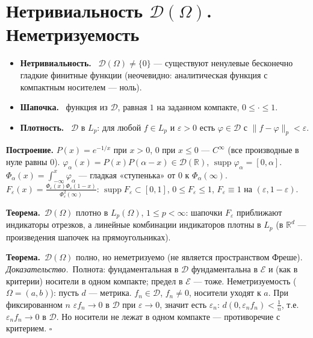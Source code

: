 \documentclass[11pt,a4paper]{article}
\newcommand{\RR}{\mathbb R}
\newcommand{\DD}{\mathcal D}
\newcommand{\EE}{\mathcal E}
\newcommand{\supp}{\operatorname{supp}}
\newcommand{\df}[1]{\textbf{#1.}~}
\newcommand{\thm}{\textbf{Теорема.}~}
\newcommand{\pf}{\textit{Доказательство.}~}
\newcommand{\qedd}{\hfill$\square$}
\begin{document}
\section{Нетривиальность $\DD(\Omega)$. Неметризуемость}
\begin{defs}
\begin{itemize}
\item \df{Нетривиальность} $\DD(\Omega)\ne\{0\}$ — существуют ненулевые бесконечно гладкие финитные функции (неочевидно: аналитическая функция с компактным носителем — ноль).
\item \df{Шапочка} функция из $\DD$, равная $1$ на заданном компакте, $0\le\cdot\le1$.
\item \df{Плотность} $\DD$ в $L_p$: для любой $f\in L_p$ и $\varepsilon>0$ есть $\varphi\in\DD$ с $\|f-\varphi\|_p<\varepsilon$.
\end{itemize}
\end{defs}

\textbf{Построение.} $P(x)=e^{-1/x}$ при $x>0$, $0$ при $x\le0$ — $C^\infty$ (все производные в нуле равны $0$). $\varphi_\alpha(x)=P(x)P(\alpha-x)\in\DD(\RR)$, $\supp\varphi_\alpha=[0,\alpha]$. $\Phi_\alpha(x)=\int_{-\infty}^x\varphi_\alpha$ — гладкая «ступенька» от $0$ к $\Phi_\alpha(\infty)$. $F_\varepsilon(x)=\frac{\Phi_\varepsilon(x)\Phi_\varepsilon(1-x)}{\Phi_\varepsilon^2(\infty)}$: $\supp F_\varepsilon\subset[0,1]$, $0\le F_\varepsilon\le1$, $F_\varepsilon\equiv1$ на $(\varepsilon,1-\varepsilon)$.

\thm $\DD(\Omega)$ плотно в $L_p(\Omega)$, $1\le p<\infty$: шапочки $F_\varepsilon$ приближают индикаторы отрезков, а линейные комбинации индикаторов плотны в $L_p$ (в $\RR^d$ — произведения шапочек на прямоугольниках).

\thm $\DD(\Omega)$ полно, но неметризуемо (не является пространством Фреше).\\
\pf Полнота: фундаментальная в $\DD$ фундаментальна в $\EE$ и (как в критерии) носители в одном компакте; предел в $\EE$ — тоже. Неметризуемость ($\Omega=(a,b)$): пусть $d$ — метрика. $f_n\in\DD$, $f_n\ne0$, носители уходят к $a$. При фиксированном $n$ $\varepsilon f_n\to0$ в $\DD$ при $\varepsilon\to0$, значит есть $\varepsilon_n$: $d(0,\varepsilon_nf_n)<\frac1n$, т.е. $\varepsilon_nf_n\to0$ в $\DD$. Но носители не лежат в одном компакте — противоречие с критерием. \qedd
\end{document}

